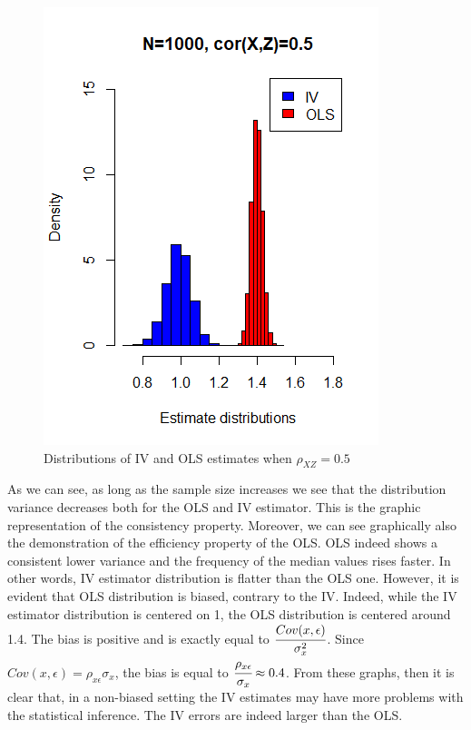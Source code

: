 \documentclass[a4paper,12pt,oneside,English]{article}
\begin{document}
\begin{figure}[p!]
\begin{minipage}[b]{0.5\linewidth}
        \includegraphics[width=\linewidth]{Fig4.png}
    \end{minipage}\hfill
    \label{Cor50}
    \caption{Distributions of IV and OLS estimates when $\rho_{XZ}=0.5$}
\end{figure}

As we can see, as long as the sample size increases we see that the distribution variance decreases both for the OLS and IV estimator. This is the graphic representation of the consistency property. Moreover, we can see graphically also the demonstration of the efficiency property of the OLS. OLS indeed shows a consistent lower variance and the frequency of the median values rises faster. In other words, IV estimator distribution is flatter than the OLS one. However, it is evident that OLS distribution is biased, contrary to the IV. Indeed, while the IV estimator distribution is centered on 1, the OLS distribution is centered around 1.4. The bias is positive and is exactly equal to $\cfrac{Cov(x,\epsilon)}{\sigma^2_x}$. Since $Cov(x,\epsilon)=\rho_{x\epsilon}\sigma_x$, the bias is equal to $\cfrac{\rho_{x\epsilon}}{\sigma_x}\approx 0.4$. From these graphs, then it is clear that, in a non-biased setting the IV estimates may have more problems with the statistical inference. The IV errors are indeed larger than the OLS.
\end{document}
